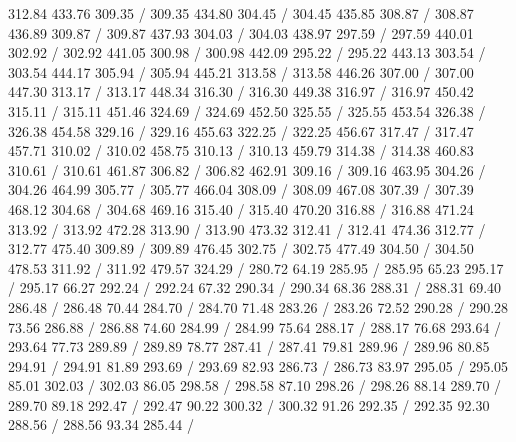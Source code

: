 { 312.84 433.76 309.35 /
 309.35 434.80 304.45 /
 304.45 435.85 308.87 /
 308.87 436.89 309.87 /
 309.87 437.93 304.03 /
 304.03 438.97 297.59 /
 297.59 440.01 302.92 /
 302.92 441.05 300.98 /
 300.98 442.09 295.22 /
 295.22 443.13 303.54 /
 303.54 444.17 305.94 /
 305.94 445.21 313.58 /
 313.58 446.26 307.00 /
 307.00 447.30 313.17 /
 313.17 448.34 316.30 /
 316.30 449.38 316.97 /
 316.97 450.42 315.11 /
 315.11 451.46 324.69 /
 324.69 452.50 325.55 /
 325.55 453.54 326.38 /
 326.38 454.58 329.16 /
 329.16 455.63 322.25 /
 322.25 456.67 317.47 /
 317.47 457.71 310.02 /
 310.02 458.75 310.13 /
 310.13 459.79 314.38 /
 314.38 460.83 310.61 /
 310.61 461.87 306.82 /
 306.82 462.91 309.16 /
 309.16 463.95 304.26 /
 304.26 464.99 305.77 /
 305.77 466.04 308.09 /
 308.09 467.08 307.39 /
 307.39 468.12 304.68 /
 304.68 469.16 315.40 /
 315.40 470.20 316.88 /
 316.88 471.24 313.92 /
 313.92 472.28 313.90 /
 313.90 473.32 312.41 /
 312.41 474.36 312.77 /
 312.77 475.40 309.89 /
 309.89 476.45 302.75 /
 302.75 477.49 304.50 /
 304.50 478.53 311.92 /
 311.92 479.57 324.29 /
\setsolid
{} 280.72 64.19 285.95 /
 285.95 65.23 295.17 /
 295.17 66.27 292.24 /
 292.24 67.32 290.34 /
 290.34 68.36 288.31 /
 288.31 69.40 286.48 /
 286.48 70.44 284.70 /
 284.70 71.48 283.26 /
 283.26 72.52 290.28 /
 290.28 73.56 286.88 /
 286.88 74.60 284.99 /
 284.99 75.64 288.17 /
 288.17 76.68 293.64 /
 293.64 77.73 289.89 /
 289.89 78.77 287.41 /
 287.41 79.81 289.96 /
 289.96 80.85 294.91 /
 294.91 81.89 293.69 /
 293.69 82.93 286.73 /
 286.73 83.97 295.05 /
 295.05 85.01 302.03 /
 302.03 86.05 298.58 /
 298.58 87.10 298.26 /
 298.26 88.14 289.70 /
 289.70 89.18 292.47 /
 292.47 90.22 300.32 /
 300.32 91.26 292.35 /
 292.35 92.30 288.56 /
 288.56 93.34 285.44 /
}
